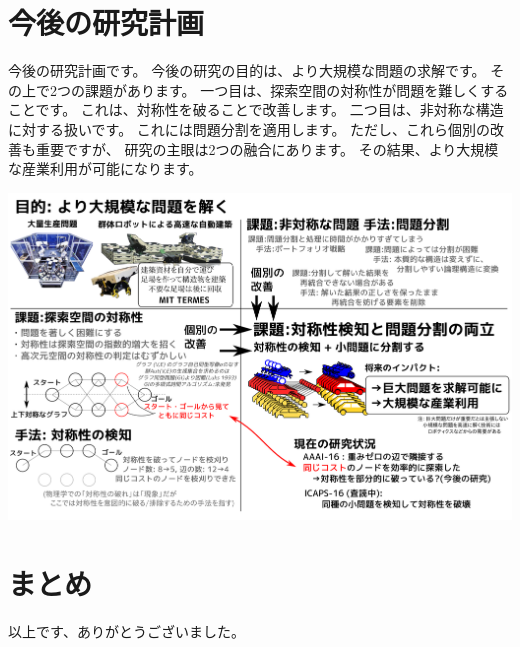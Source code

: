 \section{今後の研究計画}
\label{sec-6}

\begin{resume}
今後の研究計画です。
今後の研究の目的は、より大規模な問題の求解です。
その上で2つの課題があります。
一つ目は、探索空間の対称性が問題を難しくすることです。
これは、対称性を破ることで改善します。
二つ目は、非対称な構造に対する扱いです。
これには問題分割を適用します。
ただし、これら個別の改善も重要ですが、
研究の主眼は2つの融合にあります。
その結果、より大規模な産業利用が可能になります。
\end{resume}

\includegraphics{img/symmetry.png}

\section{まとめ}
\label{sec-7}

\begin{resume}
以上です、ありがとうございました。
\end{resume}

